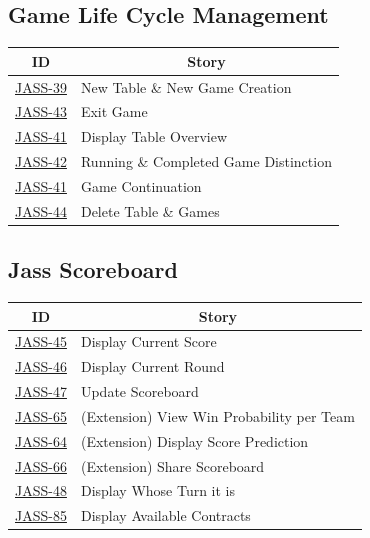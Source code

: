 \subsection {Game Life Cycle Management}

\begin{tabular} { | m{1.75 cm} | m{5.25cm} | }
    \hline
    \multicolumn{1}{|c|}{\textbf{ID}} & \multicolumn{1}{|c|}{ \textbf{Story} }  \\
    \hline
    \href{https://jasstracker-jira.atlassian.net/browse/JASS-39}{JASS-39}  & New Table \& New Game Creation \\
    \hline
    \href{https://jasstracker-jira.atlassian.net/browse/JASS-43}{JASS-43} & Exit Game \\
    \hline
    \href{https://jasstracker-jira.atlassian.net/browse/JASS-41}{JASS-41} & Display Table Overview \\ 
    \hline
    \href{https://jasstracker-jira.atlassian.net/browse/JASS-42}{JASS-42} & Running \& Completed Game Distinction \\
    \hline
    \href{https://jasstracker-jira.atlassian.net/browse/JASS-41}{JASS-41} & Game Continuation \\ 
    \hline
    \href{https://jasstracker-jira.atlassian.net/browse/JASS-44}{JASS-44} & Delete Table \& Games \\
    \hline
\end{tabular}

\subsection{Jass Scoreboard}
\begin{tabular} { | m{1.75 cm} | m{5.25cm} | }
    \hline
    \multicolumn{1}{|c|}{\textbf{ID}} & \multicolumn{1}{|c|}{ \textbf{Story} }  \\
    \hline
    \href{https://jasstracker-jira.atlassian.net/browse/JASS-45}{JASS-45} & Display Current Score \\
    \hline
    \href{https://jasstracker-jira.atlassian.net/browse/JASS-46}{JASS-46} & Display Current Round \\
    \hline
    \href{https://jasstracker-jira.atlassian.net/browse/JASS-47}{JASS-47} & Update Scoreboard \\
    \hline
    \href{https://jasstracker-jira.atlassian.net/browse/JASS-65}{JASS-65} & (Extension) View Win Probability per Team \\
    \hline
    \href{https://jasstracker-jira.atlassian.net/browse/JASS-64}{JASS-64} & (Extension) Display Score Prediction \\
    \hline
    \href{https://jasstracker-jira.atlassian.net/browse/JASS-66}{JASS-66} & (Extension) Share Scoreboard \\
    \hline
    \href{https://jasstracker-jira.atlassian.net/browse/JASS-48}{JASS-48} & Display Whose Turn it is \\
    \hline
    \href{https://jasstracker-jira.atlassian.net/browse/JASS-85}{JASS-85} & Display Available Contracts \\
    \hline
\end{tabular}

